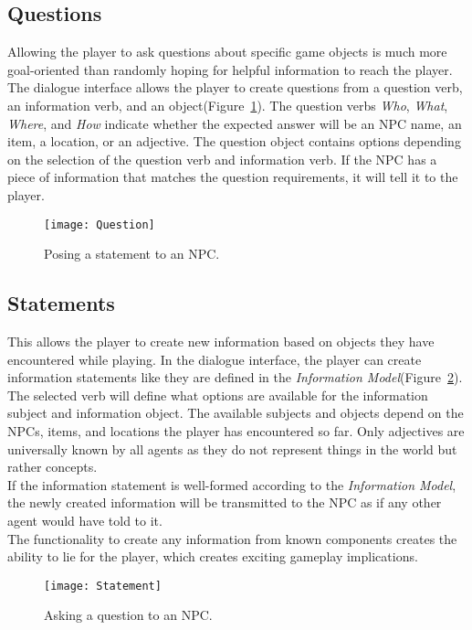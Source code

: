 \subsection{Questions}
Allowing the player to ask questions about specific game objects is much more goal-oriented than randomly hoping for helpful information to reach the player. The dialogue interface allows the player to create questions from a question verb, an information verb, and an object(Figure~\ref{fig:question}). The question verbs \textit{Who}, \textit{What}, \textit{Where}, and \textit{How} indicate whether the expected answer will be an NPC name, an item, a location, or an adjective. The question object contains options depending on the selection of the question verb and information verb. If the NPC has a piece of information that matches the question requirements, it will tell it to the player.
\begin{figure}
	\centering
	\texttt{[image: Question]}
	\caption{Posing a statement to an NPC.}
	\label{fig:question}
\end{figure}
\subsection{Statements}
This allows the player to create new information based on objects they have encountered while playing. In the dialogue interface, the player can create information statements like they are defined in the \textit{Information Model}(Figure~\ref{fig:statement}). The selected verb will define what options are available for the information subject and information object. The available subjects and objects depend on the NPCs, items, and locations the player has encountered so far. Only adjectives are universally known by all agents as they do not represent things in the world but rather concepts.\\
If the information statement is well-formed according to the \textit{Information Model}, the newly created information will be transmitted to the NPC as if any other agent would have told to it.\\
The functionality to create any information from known components creates the ability to lie for the player, which creates exciting gameplay implications.
\begin{figure}
	\centering
	\texttt{[image: Statement]}
	\caption{Asking a question to an NPC.}
	\label{fig:statement}
\end{figure}
